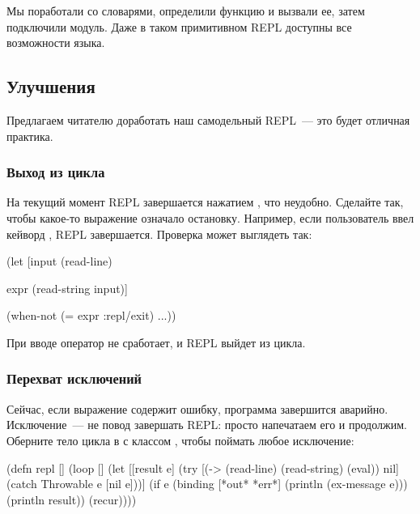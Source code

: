 Мы поработали со словарями, определили функцию и вызвали ее, затем подключили модуль. Даже в таком примитивном REPL доступны все возможности языка.

\subsection{Улучшения}

Предлагаем читателю доработать наш самодельный REPL~--- это будет отличная практика.


\subsubsection{Выход из цикла}

На текущий момент REPL завершается нажатием , что неудобно. Сделайте так, чтобы какое-то выражение означало остановку. Например, если пользователь ввел кейворд , REPL завершается. Проверка может выглядеть так:

\begin{english}
  \begin{clojure}
(let [input
      (read-line)

      expr
      (read-string input)]

  (when-not (= expr :repl/exit)
    ...))
  \end{clojure}
\end{english}

При вводе  оператор  не сработает, и REPL выйдет из цикла.

\subsubsection{Перехват исключений}


Сейчас, если выражение содержит ошибку, программа завершится аварийно. Исключение~--- не повод завершать REPL: просто напечатаем его и продолжим. Оберните тело цикла в  с классом , чтобы поймать любое исключение:

\begin{english}
  \begin{clojure/lines}
(defn repl []
  (loop []
    (let [[result e]
          (try
            [(-> (read-line)
                 (read-string)
                 (eval))
             nil]
            (catch Throwable e
              [nil e]))]
      (if e
        (binding [*out* *err*]
          (println (ex-message e)))
        (println result))
      (recur))))
  \end{clojure/lines}
\end{english}

